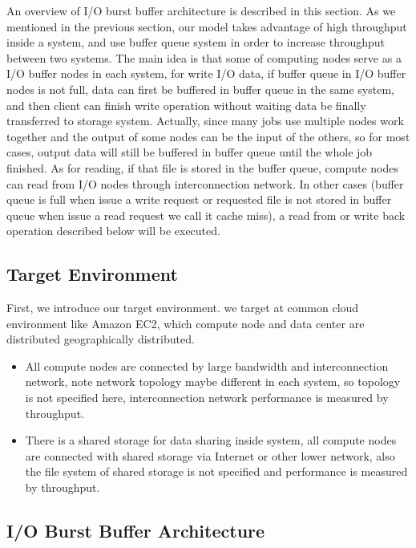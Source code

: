 An overview of I/O burst buffer architecture is described in this section.
As we mentioned in the previous section, our model takes advantage of high
throughput inside a system, and use buffer queue system in order to increase throughput between two systems.
The main idea is that some of computing nodes serve as a I/O buffer nodes in each system, for write I/O data, if buffer queue in I/O buffer nodes is not full, data can first be buffered in buffer queue in the same system, and then client can finish write operation without waiting data be finally transferred to storage system.
Actually, since many jobs use multiple nodes work together and the output of some nodes can be the
input of the others, so for most cases, output data will still be buffered in buffer queue until the whole job finished.
As for reading, if that file is stored in the buffer queue, compute nodes can read from I/O nodes through interconnection network.
In other cases (buffer queue is full when issue a write request or requested file is not stored in buffer queue when issue a read request we call it cache miss), a read from or write back operation described below will be executed. 

\subsection{Target Environment}
First, we introduce our target environment.
we target at common cloud environment like Amazon EC2, which compute node and data center are distributed geographically distributed.

\begin{itemize}
	\item All compute nodes are connected by large bandwidth and interconnection network, note network topology maybe different in each system, so topology is not specified here, interconnection network performance is measured by throughput.
	\item There is a shared storage for data sharing inside system, all compute nodes are connected
	with shared storage via Internet or other lower network, also the file system of shared storage is not specified and performance is measured by throughput.
\end{itemize}

\subsection{I/O Burst Buffer Architecture}

